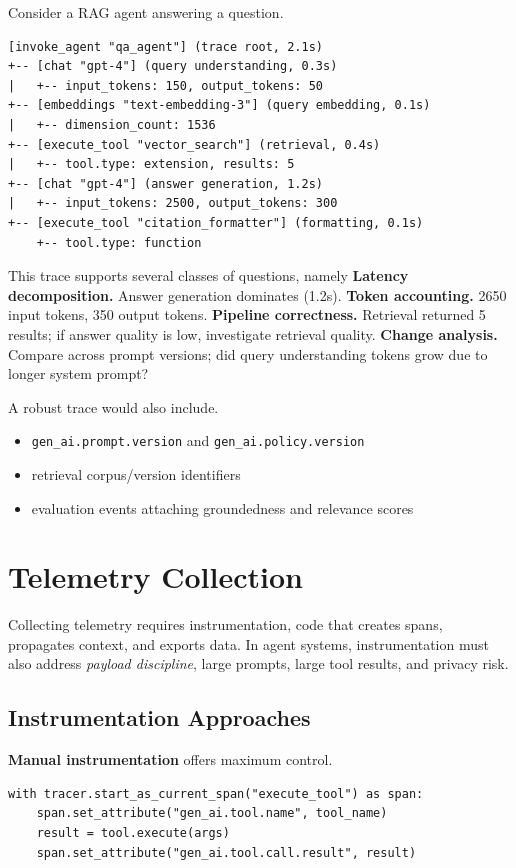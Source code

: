 Consider a RAG agent answering a question. \begin{verbatim}
[invoke_agent "qa_agent"] (trace root, 2.1s)
+-- [chat "gpt-4"] (query understanding, 0.3s)
|   +-- input_tokens: 150, output_tokens: 50
+-- [embeddings "text-embedding-3"] (query embedding, 0.1s)
|   +-- dimension_count: 1536
+-- [execute_tool "vector_search"] (retrieval, 0.4s)
|   +-- tool.type: extension, results: 5
+-- [chat "gpt-4"] (answer generation, 1.2s)
|   +-- input_tokens: 2500, output_tokens: 300
+-- [execute_tool "citation_formatter"] (formatting, 0.1s)
    +-- tool.type: function
\end{verbatim}

This trace supports several classes of questions, namely \textbf{Latency decomposition.} Answer generation dominates (1.2s).  
\textbf{Token accounting.} 2650 input tokens, 350 output tokens.  
\textbf{Pipeline correctness.} Retrieval returned 5 results; if answer quality is low, investigate retrieval quality.  
\textbf{Change analysis.} Compare across prompt versions; did query understanding tokens grow due to longer system prompt?

A robust trace would also include.
\begin{itemize}
\item \texttt{gen\_ai.prompt.version} and \texttt{gen\_ai.policy.version}
\item retrieval corpus/version identifiers
\item evaluation events attaching groundedness and relevance scores
\end{itemize}

\section{Telemetry Collection}

Collecting telemetry requires instrumentation, code that creates spans, propagates context, and exports data. In agent systems, instrumentation must also address \emph{payload discipline}, large prompts, large tool results, and privacy risk.

\subsection{Instrumentation Approaches}

\textbf{Manual instrumentation} offers maximum control. \begin{verbatim}
with tracer.start_as_current_span("execute_tool") as span:
    span.set_attribute("gen_ai.tool.name", tool_name)
    result = tool.execute(args)
    span.set_attribute("gen_ai.tool.call.result", result)
\end{verbatim}

